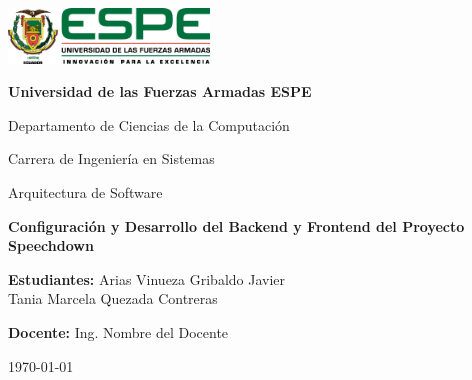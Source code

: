 \begin{titlepage}
    \centering
    \vspace*{1cm}

    \includegraphics[width=0.4\textwidth]{imagenes/logo-espe.png}\\
    \vspace{1cm}

    {\LARGE \textbf{Universidad de las Fuerzas Armadas ESPE}}\\
    \vspace{0.5cm}

    {\Large Departamento de Ciencias de la Computación}\\
    \vspace{0.5cm}

    {\large Carrera de Ingeniería en Sistemas}\\
    \vspace{2cm}

    {\Large Arquitectura de Software}\\
    \vspace{0.5cm}

    {\Huge \textbf{Configuración y Desarrollo del Backend y Frontend del Proyecto Speechdown}}\\
    \vspace{1.5cm}

    {\Large \textbf{Estudiantes:} Arias Vinueza Gribaldo Javier \\ Tania Marcela Quezada Contreras}\\
    \vspace{0.5cm}

    {\large \textbf{Docente:} Ing. Nombre del Docente}\\
    \vspace{2cm}

    {\large \today}

    \vfill
\end{titlepage}